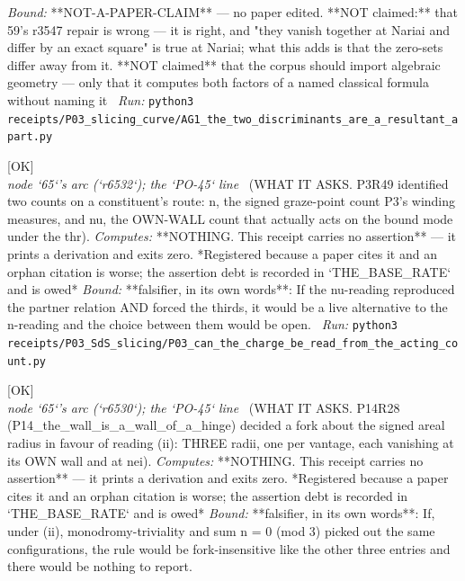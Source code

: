 \begin{description}
 \emph{Bound:} **NOT-A-PAPER-CLAIM** --- no paper edited. **NOT claimed:** that 59's r3547 repair is wrong --- it is right, and "they vanish together at Nariai and differ by an exact square" is true at Nariai; what this adds is that the zero-sets differ away from it. **NOT claimed** that the corpus should import algebraic geometry --- only that it computes both factors of a named classical formula without naming it
\ \emph{Run:} \texttt{python3 receipts/P03\_slicing\_curve/AG1\_the\_two\_discriminants\_are\_a\_resultant\_apart.py}
\item[\rcptlabel{P03_can_the_charge_be_read_from_the_acting_count}{P3R61}\textbf{P3R61}\quad\texttt{P03\_can\_the\_charge\_be\_read\_from\_the\_acting\_count}]\hfill\textsf{[OK]}\\
\textit{node `65`'s arc (`r6532`); the `PO-45` line} \ (WHAT IT ASKS. P3R49 identified two counts on a constituent's route: n, the signed graze-point count P3's winding measures, and nu, the OWN-WALL count that actually acts on the bound mode under the thr). 
\emph{Computes:}  **NOTHING. This receipt carries no assertion** --- it prints a derivation and exits zero. *Registered because a paper cites it and an orphan citation is worse; the assertion debt is recorded in `THE\_BASE\_RATE` and is owed*
 \emph{Bound:} **falsifier, in its own words**: If the nu-reading reproduced the partner relation AND forced the thirds, it would be a live alternative to the n-reading and the choice between them would be open.
\ \emph{Run:} \texttt{python3 receipts/P03\_SdS\_slicing/P03\_can\_the\_charge\_be\_read\_from\_the\_acting\_count.py}
\item[\rcptlabel{P03_closure_under_the_three_vantage_reading}{P3R62}\textbf{P3R62}\quad\texttt{P03\_closure\_under\_the\_three\_vantage\_reading}]\hfill\textsf{[OK]}\\
\textit{node `65`'s arc (`r6530`); the `PO-45` line} \ (WHAT IT ASKS. P14R28 (P14\_the\_wall\_is\_a\_wall\_of\_a\_hinge) decided a fork about the signed areal radius in favour of reading (ii): THREE radii, one per vantage, each vanishing at its OWN wall and at nei). 
\emph{Computes:}  **NOTHING. This receipt carries no assertion** --- it prints a derivation and exits zero. *Registered because a paper cites it and an orphan citation is worse; the assertion debt is recorded in `THE\_BASE\_RATE` and is owed*
 \emph{Bound:} **falsifier, in its own words**: If, under (ii), monodromy-triviality and sum n = 0 (mod 3) picked out the same configurations, the rule would be fork-insensitive like the other three entries and there would be nothing to report.

\end{description}
